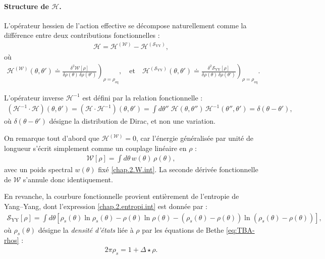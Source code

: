 \paragraph{Structure de \(\mathcal{H}\).}

L’opérateur hessien de l’action effective se décompose naturellement comme la différence entre deux contributions fonctionnelles :
\begin{eqnarray}
	\mathcal{H} = \mathcal{H}^{(\mathcal{W})} - \mathcal{H}^{(\mathcal{S}_{\mathrm{YY}})},
\end{eqnarray}
où
\begin{eqnarray}
	\mathcal{H}^{(\mathcal{W})}(\theta,\theta') \doteq \left. \frac{\delta^2 \mathcal{W}[\rho]}{\delta \rho(\theta)\, \delta \rho(\theta')} \right)_{\rho = \rho_{\mathrm{eq}}}, \quad \text{et} \quad \mathcal{H}^{(\mathcal{S}_{\mathrm{YY}})}(\theta,\theta') \doteq \left. \frac{\delta^2 \mathcal{S}_{\mathrm{YY}}[\rho]}{\delta \rho(\theta)\, \delta \rho(\theta')} \right)_{\rho = \rho_{\mathrm{eq}}}.
\end{eqnarray}

L’opérateur inverse \(\mathcal{H}^{-1}\) est défini par la relation fonctionnelle :
\begin{eqnarray}
	(\mathcal{H}^{-1} \cdot \mathcal{H})(\theta, \theta') = (\mathcal{H} \cdot \mathcal{H}^{-1})(\theta, \theta') = \int d\theta'' \; \mathcal{H}(\theta, \theta'')\, \mathcal{H}^{-1}(\theta'', \theta') = \delta(\theta - \theta'),
	\label{chap:fluctu:eq:hessienner.prod.inv} 	
\end{eqnarray}
où \(\delta(\theta - \theta')\) désigne la distribution de Dirac, et non une variation.

\medskip

On remarque tout d’abord que \(\mathcal{H}^{(\mathcal{W})} = 0\), car l’énergie généralisée par unité de longueur s’écrit simplement comme un couplage linéaire en \(\rho\) :
\begin{eqnarray*}
	\mathcal{W}[\rho] = \int d\theta \, w(\theta)\, \rho(\theta),
\end{eqnarray*}
avec un poids spectral \(w(\theta)\) fixé \eqref{chap.2.W.int}. La seconde dérivée fonctionnelle de \(\mathcal{W}\) s’annule donc identiquement.

En revanche, la courbure fonctionnelle provient entièrement de l'entropie de Yang–Yang, dont l’expression \eqref{chap.2.entropi.int} est donnée par :
\begin{eqnarray}
	\mathcal{S}_{\mathrm{YY}}[\rho] = \int d\theta \left[
	\rho_s(\theta) \ln \rho_s(\theta) - \rho(\theta) \ln \rho(\theta) - (\rho_s(\theta) - \rho(\theta)) \ln(\rho_s(\theta) - \rho(\theta))
	\right],
\end{eqnarray}
où \(\rho_s(\theta)\) désigne la {\em densité d’états} liée à \(\rho\) par les équations de Bethe \eqref{eq:TBA-rhos} :
\begin{eqnarray}
	2\pi \rho_s = 1 + \Delta \star \rho.	
\end{eqnarray}


